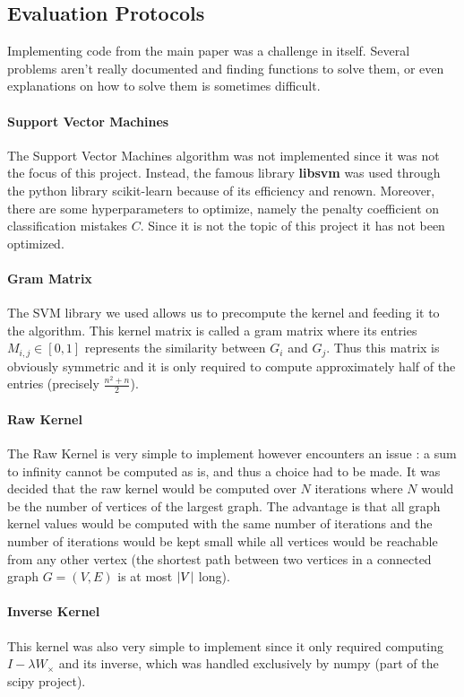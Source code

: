 \documentclass{article}
\DeclarePairedDelimiter{\abs}{\lvert}{\rvert}
\theoremstyle{definition}
\begin{document}
\subsection{Evaluation Protocols}
Implementing code from the main paper was a challenge in itself. Several problems aren't really documented and finding functions to solve them, or even explanations on how to solve them is sometimes difficult.
\paragraph{Support Vector Machines}
The Support Vector Machines algorithm was not implemented since it was not the focus of this project. Instead, the famous library \textbf{libsvm}\cite{cc2011libsvm} was used through the python library scikit-learn\cite{pedregosa2011scikit} because of its efficiency and renown. Moreover, there are some hyperparameters to optimize, namely the penalty coefficient on classification mistakes $C$. Since it is not the topic of this project it has not been optimized.
\paragraph{Gram Matrix}
The SVM library we used allows us to precompute the kernel and feeding it to the algorithm. This kernel matrix is called a gram matrix where its entries $M_{i,j}\in [0,1]$ represents the similarity between $G_i$ and $G_j$. Thus this matrix is obviously symmetric and it is only required to compute approximately half of the entries (precisely $\frac{n^2+n}{2}$).
\paragraph{Raw Kernel}
The Raw Kernel is very simple to implement however encounters an issue : a sum to infinity cannot be computed as is, and thus a choice had to be made. It was decided that the raw kernel would be computed over $N$ iterations where $N$ would be the number of vertices of the largest graph. The advantage is that all graph kernel values would be computed with the same number of iterations and the number of iterations would be kept small while all vertices would be reachable from any other vertex (the shortest path between two vertices in a connected graph $G=(V,E)$ is at most $\abs{V}$ long).  
\paragraph{Inverse Kernel}
This kernel was also very simple to implement  since it only required computing $I-\lambda W_{\times}$ and its inverse, which was handled exclusively by numpy (part of the scipy project).
\end{document}
